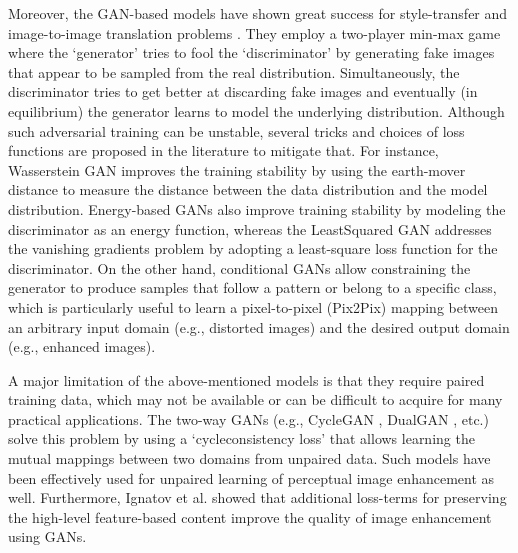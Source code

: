 \documentclass[a4paper]{article}
\begin{document}
Moreover, the GAN-based models \cite{goodfellow2014generative} have shown great success for style-transfer and image-to-image translation problems \cite{isola2018imagetoimage}. They employ a two-player min-max game where the ‘generator’ tries to fool the ‘discriminator’ by generating fake images that appear to be sampled from the real distribution. Simultaneously, the discriminator tries to get better at discarding fake images and eventually (in equilibrium) the generator learns to model the underlying distribution. Although such adversarial training can be unstable, several tricks and choices of loss functions are proposed in the literature to mitigate that. For instance, Wasserstein GAN \cite{arjovsky2017wasserstein} improves the training stability by using the earth-mover distance to measure the distance between the data distribution and the model distribution. Energy-based GANs \cite{zhao2017energybased} also improve training stability by modeling the discriminator as an energy function, whereas the LeastSquared GAN \cite{mao2017squares} addresses the vanishing gradients problem by adopting a least-square loss function for the discriminator. On the other hand, conditional GANs \cite{mirza2014conditional} allow constraining the generator to produce samples that follow a pattern or belong to a specific class, which is particularly useful to learn a pixel-to-pixel (Pix2Pix) mapping \cite{isola2018imagetoimage} between an arbitrary input domain (e.g., distorted images) and the desired output domain (e.g., enhanced images).

A major limitation of the above-mentioned models is that they require paired training data, which may not be available or can be difficult to acquire for many practical applications. The two-way GANs (e.g., CycleGAN \cite{zhu2020unpaired}, DualGAN \cite{yi2018dualgan}, etc.) solve this problem by using a ‘cycleconsistency loss’ that allows learning the mutual mappings between two domains from unpaired data. Such models have been effectively used for unpaired learning of perceptual image enhancement \cite{8578758} as well. Furthermore, Ignatov et al. \cite{ignatov2017dslrquality} showed that additional loss-terms for preserving the high-level feature-based content improve the quality of image enhancement using GANs.
\end{document}
